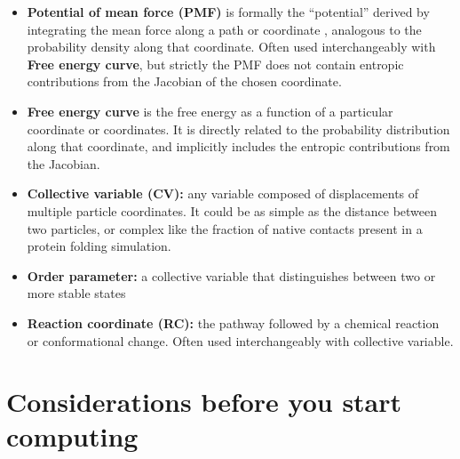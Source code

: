 \documentclass[9pt]{livecoms}
\begin{document}
\begin{itemize}

  \item \textbf{Potential of mean force (PMF)} is formally the ``potential'' derived by integrating the mean force along a path or coordinate \cite{Kirkwood-1935}, analogous to the probability density along that coordinate.  Often used interchangeably with \textbf{Free energy curve}, but strictly the PMF does not contain entropic contributions from the Jacobian of the chosen coordinate.

  \item \textbf{Free energy curve} is the free energy as a function of a
  particular coordinate or coordinates.  It is directly related to the
  probability distribution along that coordinate, and implicitly includes the
  entropic contributions from the Jacobian.


  \item \textbf{Collective variable (CV):} any variable composed of displacements of
  multiple particle coordinates.  It could be as simple as the distance between
  two particles, or complex like the fraction of native contacts present in a
  protein folding simulation.

  \item \textbf{Order parameter:}  a collective variable that distinguishes between two or more stable states

  \item \textbf{Reaction coordinate (RC):} the pathway followed by a chemical reaction or conformational change.  Often used interchangeably with collective variable.

\end{itemize}

\section{Considerations before you start computing}
\end{document}
